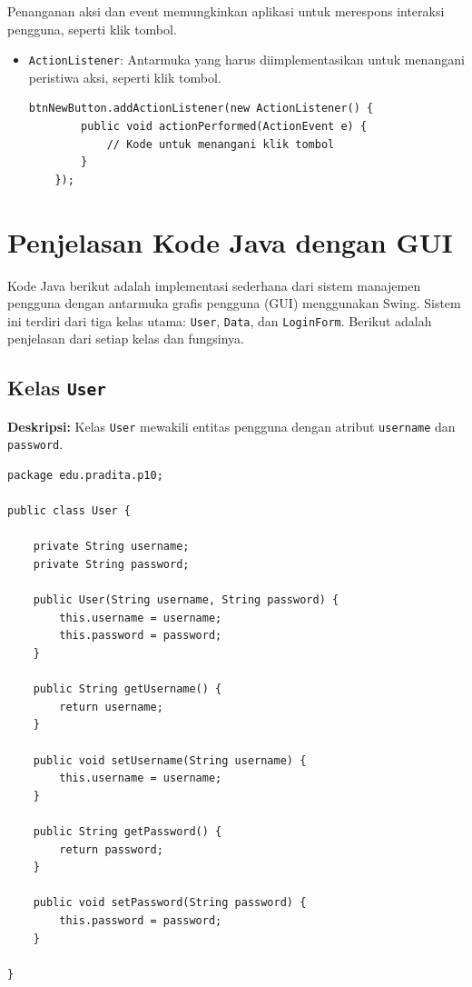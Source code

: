 Penanganan aksi dan event memungkinkan aplikasi untuk merespons interaksi pengguna, seperti klik tombol.

\begin{itemize}
\item \texttt{ActionListener}: Antarmuka yang harus diimplementasikan untuk menangani peristiwa aksi, seperti klik tombol.
\begin{lstlisting}[style=JavaStyle]
	btnNewButton.addActionListener(new ActionListener() {
		public void actionPerformed(ActionEvent e) {
			// Kode untuk menangani klik tombol
		}
	});
\end{lstlisting}
\end{itemize}




\section{Penjelasan Kode Java dengan GUI}

Kode Java berikut adalah implementasi sederhana dari sistem manajemen pengguna dengan antarmuka grafis pengguna (GUI) menggunakan Swing. Sistem ini terdiri dari tiga kelas utama: \texttt{User}, \texttt{Data}, dan \texttt{LoginForm}. Berikut adalah penjelasan dari setiap kelas dan fungsinya.

\subsection{Kelas \texttt{User}}

\textbf{Deskripsi:} Kelas \texttt{User} mewakili entitas pengguna dengan atribut \texttt{username} dan \texttt{password}.

\begin{lstlisting}[style=JavaStyle]
package edu.pradita.p10;

public class User {
	
	private String username;
	private String password;
	
	public User(String username, String password) {
		this.username = username;
		this.password = password;
	}
	
	public String getUsername() {
		return username;
	}
	
	public void setUsername(String username) {
		this.username = username;
	}
	
	public String getPassword() {
		return password;
	}
	
	public void setPassword(String password) {
		this.password = password;
	}
	
}

\end{lstlisting}

